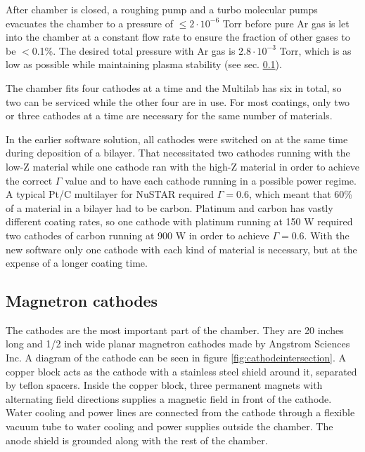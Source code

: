 After chamber is closed, a roughing pump and a turbo molecular pumps evacuates the chamber to a pressure of $\leq2\cdot10^{-6}$ Torr before pure Ar gas is let into the chamber at a constant flow rate to ensure the fraction of other gases to be $<$0.1\%. The desired total pressure with Ar gas is $2.8\cdot10^{-3}$ Torr, which is as low as possible while maintaining plasma stability (see sec. \ref{sec:magnetrons}).

The chamber fits four cathodes at a time and the Multilab has six in total, so two can be serviced while the other four are in use. For most coatings, only two or three cathodes at a time are necessary for the same number of materials.

In the earlier software solution, all cathodes were switched on at the same time during deposition of a bilayer. That necessitated two cathodes running with the low-Z material while one cathode ran with the high-Z material in order to achieve the correct $\Gamma$ value and to have each cathode running in a possible power regime. A typical Pt/C  multilayer for NuSTAR required $\Gamma = 0.6$, which meant that 60\% of a material in a bilayer had to be carbon. Platinum and carbon has vastly different coating rates, so one cathode with platinum running at 150 W required two cathodes of carbon running at 900 W in order to achieve $\Gamma = 0.6$. With the new software only one cathode with each kind of material is necessary, but at the expense of a longer coating time.

\subsection{Magnetron cathodes}\label{sec:magnetrons}
The cathodes are the most important part of the chamber. They are 20 inches long and 1/2 inch wide planar magnetron cathodes made by Angstrom Sciences Inc. A diagram of the cathode can be seen in figure \ref{fig:cathodeintersection}. A copper block acts as the cathode with a stainless steel shield around it, separated by teflon spacers. Inside the copper block, three permanent magnets with alternating field directions supplies a magnetic field in front of the cathode. Water cooling and power lines are connected from the cathode through a flexible vacuum tube to water cooling and power supplies outside the chamber. The anode shield is grounded along with the rest of the chamber.

